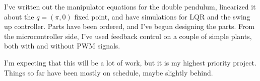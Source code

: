 \documentclass{article}
\begin{document}
I've written out the manipulator equations for the double pendulum, linearized it about the $q=(\pi,0)$ fixed point, and have simulations for LQR and the swing up controller. Parts have been ordered, and I've begun designing the parts. From the microcontroller side, I've used feedback control on a couple of simple plants, both with and without PWM signals.

I'm expecting that this will be a lot of work, but it is my highest priority project. Things so far have been mostly on schedule, maybe slightly behind.
\end{document}
